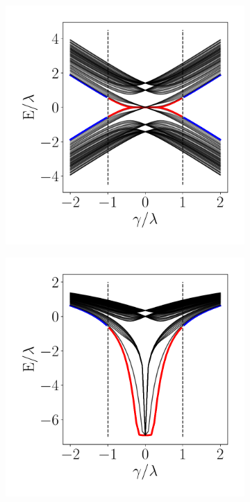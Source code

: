 \begin{figure}[h!]
     \centering
    \captionsetup[sub]{font=small}
     \begin{subfigure}[b!]{0.3 \textwidth}
         \caption{}
         \includegraphics[width=\textwidth]{Imagenes/Resultados_Hoti_Fractal/bands_square_shh.pdf}
         \label{}
     \end{subfigure}\hspace*{-0.5em}
     \begin{subfigure}[b!]{0.3 \textwidth}
         \caption{}
         \includegraphics[width=\textwidth]{Imagenes/Resultados_Hoti_Fractal/bands_square_shh_log.pdf}

\end{subfigure}
\end{figure}
